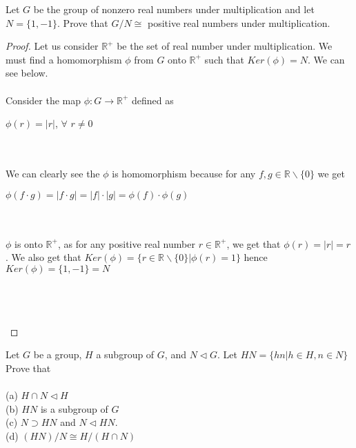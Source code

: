 \documentclass[12pt]{article}
\newenvironment{problem}[2][Problem]{\begin{trivlist}
\item[\hskip \labelsep {\bfseries #1}\hskip \labelsep {\bfseries #2.}]}{\end{trivlist}}
\begin{document}
\begin{problem}{2.7.3}
Let $G$ be the group of nonzero real numbers under multiplication and let $N= \{ 1, -1 \}$. Prove that $G/N \cong$ positive real numbers under multiplication.
\end{problem}

\begin{proof}
Let us consider $\mathbb{R}^+$ be the set of real number under multiplication. We must find a homomorphism $\phi$ from $G$ onto $\mathbb{R}^+$ such that $Ker(\phi)=N$. We can see below. \\ \\
Consider the map $\phi : G \rightarrow \mathbb{R}^+$ defined as \\ 
\centerline{$\phi(r) = |r|$, $\forall$ $r \neq 0$} \\ \\
We can clearly see the $\phi$ is homomorphism because for any $f,g \in \mathbb{R} \backslash \{0\} $ we get \\ 
\centerline{$\phi(f \cdot g) = |f \cdot g| = |f| \cdot |g| = \phi(f) \cdot \phi (g)$} \\ \\
$\phi$ is onto $\mathbb{R}^+$, as for any positive real number $r \in \mathbb{R}^+$, we get that $\phi(r) = |r| = r$. We also get that $Ker(\phi) = \{ r \in \mathbb{R} \backslash \{0\} | \phi(r) = 1 \}$ hence $Ker(\phi) = \{1,-1 \} = N$ \\ \\
\centerline{} \\ \\
\end{proof}

\begin{problem}{2.7.5}
Let $G$ be a group, $H$ a subgroup of $G$, and $N \triangleleft G$. Let $HN = \{hn | h \in H, n\in N \}$ Prove that \\ \\
(a) $H \cap N \triangleleft H$ \\
(b) $HN$ is a subgroup of $G$\\
(c) $N \supset HN$ and $N \triangleleft HN$. \\
(d) $(HN)/N \cong H/(H \cap N)$ \\
\end{problem}
\end{document}
